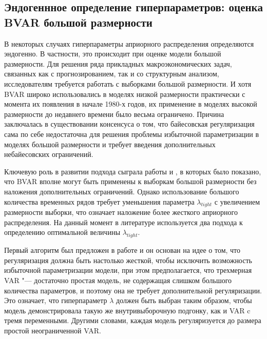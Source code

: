 \documentclass[11pt]{article} %
\begin{document}
\subsection{Эндогеннное определение гиперпараметров: оценка BVAR большой размерности}

В некоторых случаях гиперпараметры априорного распределения определяются эндогенно. В частности, это происходит при оценке модели большой размерности.
Для решения ряда прикладных макроэкономических задач, связанных как с прогнозированием, так и со структурным анализом, исследователям требуется работать с выборками большой размерности.  И хотя BVAR широко использовались в моделях низкой размерности практически с момента их появления в начале 1980-х годов, их применение  в моделях высокой размерности до недавнего времени было весьма ограничено. Причина заключалась в существовании консенсуса о том, что байесовская регуляризация сама по себе недостаточна для решения проблемы избыточной параметризации в моделях большой размерности и требует введения дополнительных небайесовских ограничений.

Ключевую роль в развитии подхода сыграла работы \cite{demol_al_2008} и \cite{banbura_al_2010}, в которых было показано, что BVAR вполне могут быть применены к выборкам большой размерности без наложения дополнительных ограничений. Однако использование большого количества временных рядов требует уменьшения параметра $\lambda_{tight}$ с увеличением размерности выборки, что означает наложение более жесткого априорного распределения. На данный момент в литературе используется два подхода к определению оптимальной величины $\lambda_{tight}$.

Первый алгоритм был предложен в работе \cite{banbura_al_2010} и он основан на идее о том, что регуляризация должна быть настолько жесткой, чтобы исключить возможность избыточной параметризации модели, при этом предполагается, что трехмерная VAR "--- достаточно простая  модель, не содержащая слишком большого количества параметров, и поэтому она не требует дополнительной регуляризации. Это означает, что гиперпараметр  $\lambda$ должен быть выбран таким образом, чтобы модель демонстрировала такую же внутривыборочную подгонку, как и VAR c тремя переменными. Другими словами,  каждая модель регуляризуется до размера простой неограниченной VAR.
\end{document}
